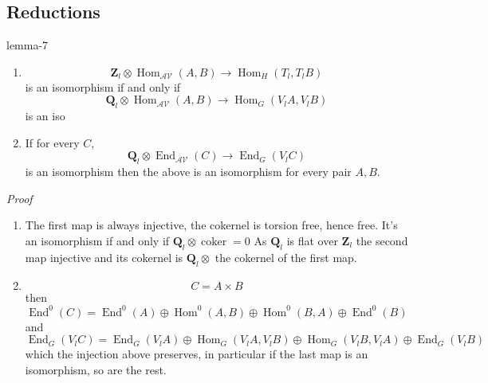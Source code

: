 \documentclass[10pt,]{book}
\makeatletter
\renewcommand*{\proofname}{Proof}
\renewenvironment{proof}[1][\proofname]{\par
  \pushQED{\qed}%
  \normalfont \topsep6\p@\@plus6\p@\relax
  \trivlist
  \item\relax
    {\itshape
    #1\@addpunct{.}}\hspace\labelsep\ignorespaces
}{%
  \popQED\endtrivlist\@endpefalse
}
\numberwithin{equation}{section}
\newcommand{\ZZ}{\mathbf{Z}}
\newcommand{\QQ}{\mathbf{Q}}
\newcommand{\cat}[1]{\mathcal{#1}}
\DeclareMathOperator{\coker}{coker}
\DeclareMathOperator{\End}{End}
\DeclareMathOperator{\Hom}{Hom}
\makeatother
\begin{document}
\subsection[{Reductions}]{Reductions}\label{subsection-33}
\begin{lemma}{}{}{lemma-7}%
\hypertarget{p-385}{}%
\leavevmode%
\begin{enumerate}
\item\hypertarget{li-73}{}%
\begin{equation*}
\ZZ_l \otimes \Hom_\cat{AV} (A,B) \to \Hom_H(T_l, T_lB)
\end{equation*}
is an isomorphism if and only if%
\begin{equation*}
\QQ_l \otimes \Hom_\cat{AV} (A,B) \to \Hom_G(V_l A, V_l B)
\end{equation*}
is an iso%
\item\hypertarget{li-74}{}If for every \(C\),%
\begin{equation*}
\QQ_l \otimes \End_\cat{AV} (C) \to \End_G(V_l C)
\end{equation*}
is an isomorphism then the above is an isomorphism for every pair \(A,B\).%
\end{enumerate}
%
\end{lemma}
\begin{proof}\hypertarget{proof-65}{}
\hypertarget{p-386}{}%
\leavevmode%
\begin{enumerate}
\item\hypertarget{li-75}{}The first map is always injective, the cokernel is torsion free, hence free. It's an isomorphism if and only if \(\QQ_l \otimes \coker = 0\) As \(\QQ_l\) is flat over \(\ZZ_l\) the second map injective and its cokernel is \(\QQ_l \otimes\) the cokernel of the first map.%
\item\hypertarget{li-76}{}%
\begin{equation*}
C = A\times B
\end{equation*}
then%
\begin{equation*}
\End^0(C) = \End^0(A)\oplus \Hom^0(A,B) \oplus \Hom^0(B,A) \oplus \End^0(B)
\end{equation*}
and%
\begin{equation*}
\End_G(V_lC) = \End_G(V_lA)\oplus \Hom_G(V_lA,V_lB) \oplus \Hom_G(V_lB,V_lA) \oplus \End_G(V_lB)
\end{equation*}
which the injection above preserves, in  particular if the last map is an isomorphism, so are the rest.%
\end{enumerate}
%
\end{proof}
\end{document}
